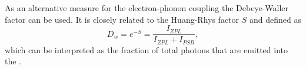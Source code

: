    As an alternative measure for the electron-phonon coupling the Debeye-Waller factor can be used. It is closely related to the Huang-Rhys factor $S$ and defined as
% 
   \begin{equation}
     D_w = e^{-S} = \frac{I_{ZPL}}{I_{ZPL} + I_{PSB}},
   \end{equation}
    which can be interpreted as the fraction of total photons that are emitted into the \zpl.





    



